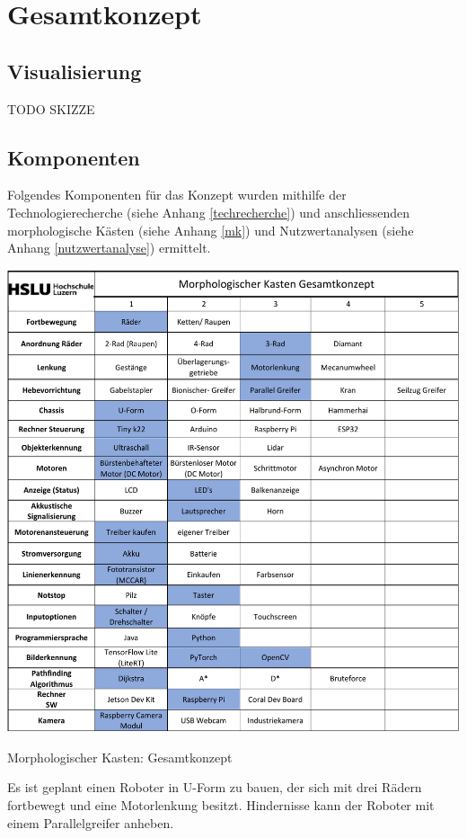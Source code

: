 \section{Gesamtkonzept}

\subsection{Visualisierung}

TODO SKIZZE


\subsection{Komponenten}

Folgendes Komponenten für das Konzept wurden mithilfe der Technologierecherche (siehe Anhang \ref{techrecherche}) und anschliessenden morphologische Kästen (siehe Anhang \ref{mk}) und Nutzwertanalysen (siehe Anhang \ref{nutzwertanalyse}) ermittelt. 

\begin{table}[H]
\centering
\includegraphics[width=\textwidth -20mm]{assets/MK-all.pdf}
\caption{Morphologischer Kasten: Gesamtkonzept}
\label{table:mk-all}
\end{table}

Es ist geplant einen Roboter in U-Form zu bauen, der sich mit drei Rädern fortbewegt und eine Motorlenkung besitzt. Hindernisse kann der Roboter mit einem Parallelgreifer anheben.

